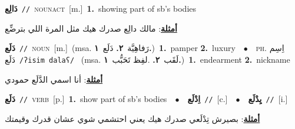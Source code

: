 \documentclass[10pt,a4paper,twoside]{article} %
\begin{document}
\begin{multicols}{2}
{\setlength\topsep{0pt}\textbf{\foreignlanguage{arabic}{دَالِع}}\ {\color{gray}\texttt{//}\color{black}}\ \textsc{noun\textunderscore act}\ [m.]\ \textbf{1.}~showing part of sb's bodies\  \begin{flushright}\color{gray}\foreignlanguage{arabic}{\textbf{\underline{\foreignlanguage{arabic}{أمثلة}}}: مالك دالِع صدرك هيك مثل المرة اللي بترضِّع}\end{flushright}\color{black}} \vspace{2mm}

{\setlength\topsep{0pt}\textbf{\foreignlanguage{arabic}{دَلَع}}\ {\color{gray}\texttt{//}\color{black}}\ \textsc{noun}\ [m.]\ \color{gray}(msa. \foreignlanguage{arabic}{رَفاهِيَّة}~\foreignlanguage{arabic}{\textbf{٢.}}  \foreignlanguage{arabic}{دَلَع}~\foreignlanguage{arabic}{\textbf{١.}})\color{black}\ \textbf{1.}~pamper  \textbf{2.}~luxury\ \ $\bullet$\ \ \textsc{ph.} \color{gray} \foreignlanguage{arabic}{اِسِم دَلَع}\color{black}\ {\color{gray}\texttt{/{\sffamily ʔisim dalaʕ}/}\color{black}}\ \color{gray} (msa. \foreignlanguage{arabic}{لَقَب}~\foreignlanguage{arabic}{\textbf{٢.}}  .\foreignlanguage{arabic}{لفِظ تَحَبُّب}~\foreignlanguage{arabic}{\textbf{١.}})\color{black}\ \textbf{1.}~endearment  \textbf{2.}~nickname\  \begin{flushright}\color{gray}\foreignlanguage{arabic}{\textbf{\underline{\foreignlanguage{arabic}{أمثلة}}}: أنا اسمي الدَّلَع حمودي}\end{flushright}\color{black}} \vspace{2mm}

{\setlength\topsep{0pt}\textbf{\foreignlanguage{arabic}{دَلَع}}\ {\color{gray}\texttt{//}\color{black}}\ \textsc{verb}\ [p.]\ \textbf{1.}~show part of sb's bodies\ \ $\bullet$\ \ \setlength\topsep{0pt}\textbf{\foreignlanguage{arabic}{اِدْلَع}}\ {\color{gray}\texttt{//}\color{black}}\ [c.]\ \ $\bullet$\ \ \setlength\topsep{0pt}\textbf{\foreignlanguage{arabic}{يِدْلَع}}\ {\color{gray}\texttt{//}\color{black}}\ [i.]\  \begin{flushright}\color{gray}\foreignlanguage{arabic}{\textbf{\underline{\foreignlanguage{arabic}{أمثلة}}}: بصيرش تِدْلَعي صدرك هيك يعني احتشمي شوي عشان قدرك وقيمتك}\end{flushright}\color{black}} \vspace{2mm}


\end{multicols}
\end{document}
